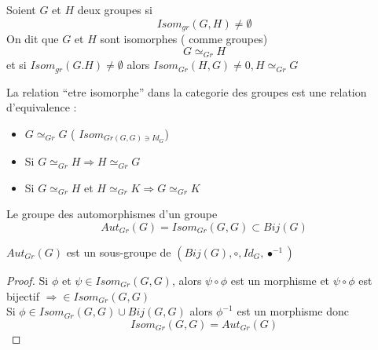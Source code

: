 \documentclass[../main.tex]{subfiles}
\begin{document}
\begin{defn}\label{defn:groupes_isomorphes}
	Soient $G$ et $H$ deux groupes si
	\[ 
		Isom_{gr} ( G,H) \neq \emptyset
	\]
	On dit que $G$ et $H$ sont isomorphes ( comme groupes)
	\[ 
	G \simeq _{Gr} H
	\]
	et si $Isom_{gr} ( G.H) \neq \emptyset$ alors
	$Isom_{Gr} ( H,G) \neq 0, H \simeq_{Gr} G$
\end{defn}
La relation ``etre isomorphe'' dans la categorie des groupes est une relation d'equivalence :
\begin{itemize}
	\item $G\simeq_{Gr} G$ ( $Isom_{Gr(G,G) \ni Id_G} $)
	\item Si $G\simeq _{Gr} H \Rightarrow  H \simeq_{Gr} G$
	\item Si $G \simeq_{Gr} H$ et $H\simeq_{Gr} K \Rightarrow  G \simeq_{Gr} K$
\end{itemize}
\begin{exemple}
Le groupe des automorphismes d'un groupe
\[ 
	Aut_{Gr} ( G) = Isom_{Gr} ( G,G) \subset Bij(G)
\]

\end{exemple}
\begin{thm}
	$Aut _{Gr} ( G)$ est un sous-groupe de $\left(Bij(G), \circ, Id_G, \bullet^{-1}\right)$
\end{thm}
\begin{proof}
	Si $\phi$ et $\psi \in Isom_{Gr} ( G,G)$, alors $\psi\circ\phi$ est un morphisme et $\psi\circ\phi$ est bijectif
	$\Rightarrow \in Isom_{Gr} ( G,G)$ \\
	Si $\phi \in Isom_{Gr} ( G,G) \cup Bij(G,G)$ alors $\phi^{-1}$ est un morphisme donc
	\[ 
		Isom_{Gr} ( G,G) = Aut_{Gr} ( G)
	\]
	
\end{proof}




	





		

		
	
\end{document}
